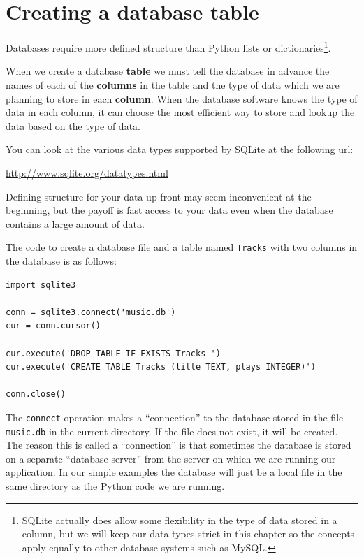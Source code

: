 \documentclass[11pt]{book}
\begin{document}
\section{Creating a database table}

Databases require more defined structure than Python lists 
or dictionaries\footnote{SQLite actually does allow some 
flexibility in the type of data stored in a column,
but we will keep our data types strict in this chapter
so the concepts apply equally to other database systems 
such as MySQL.}.  

When we create a database {\bf table} we
must tell the database in advance the names of each of the
{\bf columns} in the table and the type of data which we are 
planning to store in each {\bf column}.   When the database software
knows the type of data in each column, it can choose the most 
efficient way to store and lookup the data based on the type of
data. 

You can look at the various data types supported by SQLite
at the following url:

\url{http://www.sqlite.org/datatypes.html}

Defining structure for your data up front may seem inconvenient
at the beginning, but the payoff is fast access to your data 
even when the database contains a large amount of data.

The code to create a database file and a table 
named {\tt Tracks} with two columns in the 
database is as follows:

\beforeverb
\begin{verbatim}
import sqlite3

conn = sqlite3.connect('music.db')
cur = conn.cursor()

cur.execute('DROP TABLE IF EXISTS Tracks ')
cur.execute('CREATE TABLE Tracks (title TEXT, plays INTEGER)')

conn.close()
\end{verbatim}
\afterverb
%
The {\tt connect} operation makes a ``connection'' to the database 
stored in the file {\tt music.db} in the current directory.   If
the file does not exist, it will be created.  The reason this
is called a ``connection'' is that sometimes the database is stored
on a separate ``database server'' from the server on which we 
are running our application.  In our simple examples 
the database will just be a local file in the same directory
as the Python code we are running.
\end{document}
